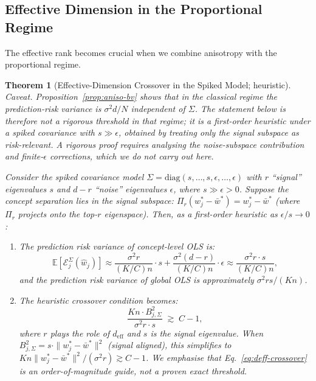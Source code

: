 \documentclass[11pt,a4paper]{article}
\newtheorem{theorem}{Theorem}
\newcommand{\E}{\mathbb{E}}
\newcommand{\what}{\hat{w}}
\newcommand{\wbar}{\bar{w}}
\newcommand{\deff}{d_{\mathrm{eff}}}
\begin{document}
\subsection{Effective Dimension in the Proportional Regime}

The effective rank becomes crucial when we combine anisotropy with the proportional regime.

\begin{theorem}[Effective-Dimension Crossover in the Spiked Model; heuristic]\label{thm:deff}
\emph{Caveat.} Proposition~\ref{prop:aniso-bv} shows that in the classical regime the prediction-risk variance is $\sigma^2 d/N$ \emph{independent} of $\Sigma$. The statement below is therefore not a rigorous threshold in that regime; it is a first-order heuristic under a spiked covariance with $s \gg \epsilon$, obtained by treating only the signal subspace as risk-relevant. A rigorous proof requires analysing the noise-subspace contribution and finite-$\epsilon$ corrections, which we do not carry out here.

Consider the spiked covariance model $\Sigma = \mathrm{diag}(s, \ldots, s, \epsilon, \ldots, \epsilon)$ with $r$ ``signal'' eigenvalues $s$ and $d - r$ ``noise'' eigenvalues $\epsilon$, where $s \gg \epsilon > 0$. Suppose the concept separation lies in the signal subspace: $\Pi_r(w_j^* - \wbar^*) = w_j^* - \wbar^*$ (where $\Pi_r$ projects onto the top-$r$ eigenspace). Then, as a first-order heuristic as $\epsilon/s \to 0$:

\begin{enumerate}[label=(\alph*)]
\item The prediction risk variance of concept-level OLS is:
\begin{equation}
\E[\mathcal{E}_j^\Sigma(\what_j)] \approx \frac{\sigma^2 r}{(K/C)n}\cdot s + \frac{\sigma^2(d-r)}{(K/C)n}\cdot \epsilon \approx \frac{\sigma^2 r \cdot s}{(K/C)n},
\end{equation}
and the prediction risk variance of global OLS is approximately $\sigma^2 r s/(Kn)$.

\item The heuristic crossover condition becomes:
\begin{equation}\label{eq:deff-crossover}
\frac{Kn \cdot B_{j,\Sigma}^2}{\sigma^2 r \cdot s} \;\gtrsim\; C - 1,
\end{equation}
where $r$ plays the role of $\deff$ and $s$ is the signal eigenvalue. When $B_{j,\Sigma}^2 = s \cdot \|w_j^* - \wbar^*\|^2$ (signal aligned), this simplifies to $Kn\|w_j^* - \wbar^*\|^2 / (\sigma^2 r) \gtrsim C - 1$. We emphasise that Eq.~\eqref{eq:deff-crossover} is an order-of-magnitude guide, not a proven exact threshold.
\end{enumerate}
\end{theorem}
\end{document}

